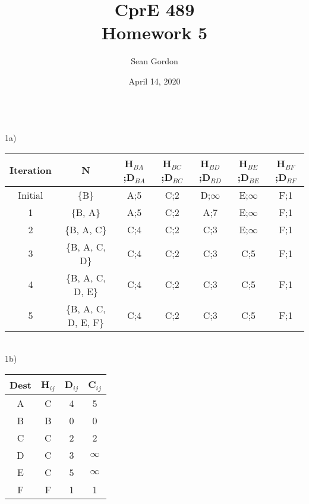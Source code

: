\documentclass[12pt]{article}
\title{CprE 489\\Homework 5}
\author{Sean Gordon}
\date{April 14, 2020}
\begin{document}
\maketitle


\noindent\hrulefill \\


\noindent 1a)
\begin{table}[h!]
\centering
\begin{tabular}{c|c|c|c|c|c|c}
\toprule
Iteration & N & H$_{BA}$;D$_{BA}$ & H$_{BC}$;D$_{BC}$ & H$_{BD}$;D$_{BD}$ & H$_{BE}$;D$_{BE}$ & H$_{BF}$;D$_{BF}$\\\bottomrule
Initial & \{B\} & A;5 & C;2 & D;$\infty$ & E;$\infty$ & F;1 \\
1 & \{B, A\} & A;5 & C;2 & A;7 & E;$\infty$ & F;1 \\
2 & \{B, A, C\} & C;4 & C;2 & C;3 & E;$\infty$ & F;1\\
3 & \{B, A, C, D\} & C;4 & C;2 & C;3 & C;5 & F;1\\
4 & \{B, A, C, D, E\} & C;4 & C;2 & C;3 & C;5 & F;1\\
5 & \{B, A, C, D, E, F\} & C;4 & C;2 & C;3 & C;5 & F;1\\\bottomrule
\end{tabular}
\end{table}\\

\noindent 1b) 
 
\begin{table}[h!]
\centering
\begin{tabular}{c|c|c|c}
\toprule
Dest & H$_{ij}$ & D$_{ij}$ & C$_{ij}$\\\bottomrule
A & C & 4 & 5 \\
B & B & 0 & 0 \\
C & C & 2 & 2 \\
D & C & 3 & $\infty$ \\
E & C & 5 & $\infty$ \\
F & F & 1 & 1 \\\bottomrule
\end{tabular}
\end{table}


\noindent\hrulefill \\
\pagebreak
\end{document}

